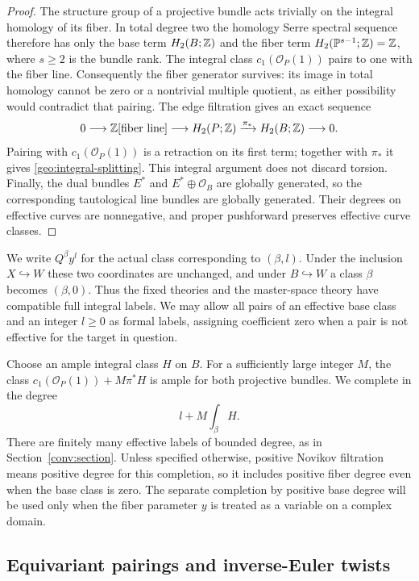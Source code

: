 \begin{proof}
The structure group of a projective bundle acts trivially on the integral
homology of its fiber.  In total degree two the homology Serre spectral
sequence therefore has only the base term $H_2(B;\mathbb Z)$ and the fiber term
$H_2(\mathbb P^{s-1};\mathbb Z)=\mathbb Z$, where $s\geq2$ is the bundle rank.
The integral class $c_1(\mathcal O_P(1))$ pairs to one with the fiber line.
Consequently the fiber generator survives: its image in total homology
cannot be zero or a nontrivial multiple quotient, as either possibility
would contradict that pairing.  The edge filtration gives an exact
sequence
\[
 0\longrightarrow\mathbb Z[\text{fiber line}]
   \longrightarrow H_2(P;\mathbb Z)
   \xrightarrow{\pi_*}H_2(B;\mathbb Z)\longrightarrow0.
\]
Pairing with $c_1(\mathcal O_P(1))$ is a retraction on its first term;
together with $\pi_*$ it gives \eqref{geo:integral-splitting}.
This integral argument does not discard torsion.
Finally, the dual bundles $E^*$ and $E^*\oplus\mathcal O_B$ are globally
generated, so the corresponding tautological line bundles are globally
generated.  Their degrees on effective curves are nonnegative, and
proper pushforward preserves effective curve classes.
\end{proof}

We write $Q^\beta y^l$ for the actual class corresponding to $(\beta,l)$.
Under the inclusion $X\hookrightarrow W$ these two coordinates are
unchanged, and under $B\hookrightarrow W$ a class $\beta$ becomes
$(\beta,0)$.  Thus the fixed theories and the master-space theory have
compatible full integral labels.  We may allow all pairs of an effective
base class and an integer $l\geq0$ as formal labels, assigning coefficient
zero when a pair is not effective for the target in question.

Choose an ample integral class $H$ on $B$.  For a sufficiently large
integer $M$, the class $c_1(\mathcal O_P(1))+M\pi^*H$ is ample for both
projective bundles.  We complete in the degree
\[
                         l+M\int_\beta H.
\]
There are finitely many effective labels of bounded degree, as in
Section~\ref{conv:section}.  Unless specified otherwise, positive
Novikov filtration means positive degree for this completion, so it
includes positive fiber degree even when the base class is zero.
The separate completion by positive base degree will be used only when
the fiber parameter $y$ is treated as a variable on a complex domain.

\subsection{Equivariant pairings and inverse-Euler twists}

